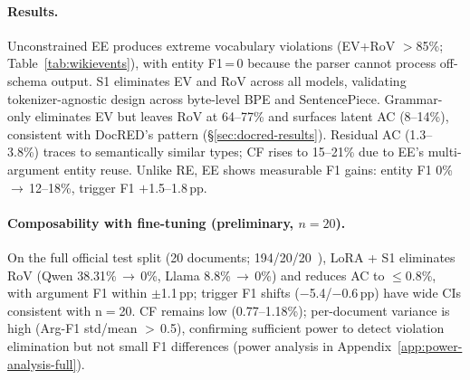 \paragraph{Results.}
Unconstrained EE produces extreme vocabulary violations (EV+RoV $>$85\%; Table~\ref{tab:wikievents}), with entity F1\,=\,0 because the parser cannot process off-schema output.
S1 eliminates EV and RoV across all models, validating tokenizer-agnostic design across byte-level BPE and SentencePiece.
Grammar-only eliminates EV but leaves RoV at 64--77\% and surfaces latent AC (8--14\%), consistent with DocRED's pattern (\S\ref{sec:docred-results}).
Residual AC (1.3--3.8\%) traces to semantically similar types; CF rises to 15--21\% due to EE's multi-argument entity reuse.
Unlike RE, EE shows measurable F1 gains: entity F1 0\%\,$\to$\,12--18\%, trigger F1 $+$1.5--1.8\,pp.

\paragraph{Composability with fine-tuning (preliminary, $n{=}20$).}
On the full official test split (20 documents; 194/20/20~\cite{li2021document}), LoRA + S1 eliminates RoV (Qwen 38.31\%\,$\to$\,0\%, Llama 8.8\%\,$\to$\,0\%) and reduces AC to $\leq$0.8\%, with argument F1 within $\pm$1.1\,pp; trigger F1 shifts ($-$5.4/$-$0.6\,pp) have wide CIs consistent with n${=}$20.
CF remains low (0.77--1.18\%); per-document variance is high (Arg-F1 std/mean ${>}$\,0.5), confirming sufficient power to detect violation elimination but not small F1 differences (power analysis in Appendix~\ref{app:power-analysis-full}).
